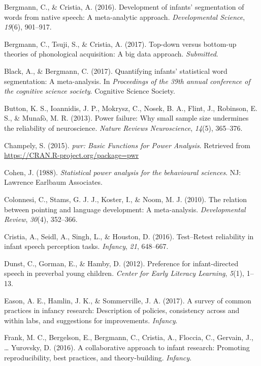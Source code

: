 \documentclass[english,floatsintext,man]{apa6}
\begin{document}
\hypertarget{ref-InWordDB}{}
Bergmann, C., \& Cristia, A. (2016). Development of infants'
segmentation of words from native speech: A meta-analytic approach.
\emph{Developmental Science}, \emph{19}(6), 901--917.

\hypertarget{ref-TopDownBottomUp}{}
Bergmann, C., Tsuji, S., \& Cristia, A. (2017). Top-down versus
bottom-up theories of phonological acquisition: A big data approach.
\emph{Submitted}.

\hypertarget{ref-InStatDB}{}
Black, A., \& Bergmann, C. (2017). Quantifying infants' statistical word
segmentation: A meta-analysis. In \emph{Proceedings of the 39th annual
conference of the cognitive science society}. Cognitive Science Society.

\hypertarget{ref-button2013power}{}
Button, K. S., Ioannidis, J. P., Mokrysz, C., Nosek, B. A., Flint, J.,
Robinson, E. S., \& Munafò, M. R. (2013). Power failure: Why small
sample size undermines the reliability of neuroscience. \emph{Nature
Reviews Neuroscience}, \emph{14}(5), 365--376.

\hypertarget{ref-pwr}{}
Champely, S. (2015). \emph{pwr: Basic Functions for Power Analysis}.
Retrieved from \url{https://CRAN.R-project.org/package=pwr}

\hypertarget{ref-cohen}{}
Cohen, J. (1988). \emph{Statistical power analysis for the behavioural
sciences}. NJ: Lawrence Earlbaum Associates.

\hypertarget{ref-PointingMA}{}
Colonnesi, C., Stams, G. J. J., Koster, I., \& Noom, M. J. (2010). The
relation between pointing and language development: A meta-analysis.
\emph{Developmental Review}, \emph{30}(4), 352--366.

\hypertarget{ref-TestRetest}{}
Cristia, A., Seidl, A., Singh, L., \& Houston, D. (2016). Test--Retest
reliability in infant speech perception tasks. \emph{Infancy},
\emph{21}, 648--667.

\hypertarget{ref-IDS_MA}{}
Dunst, C., Gorman, E., \& Hamby, D. (2012). Preference for
infant-directed speech in preverbal young children. \emph{Center for
Early Literacy Learning}, \emph{5}(1), 1--13.

\hypertarget{ref-eason2017survey}{}
Eason, A. E., Hamlin, J. K., \& Sommerville, J. A. (2017). A survey of
common practices in infancy research: Description of policies,
consistency across and within labs, and suggestions for improvements.
\emph{Infancy}.

\hypertarget{ref-Manybabies}{}
Frank, M. C., Bergelson, E., Bergmann, C., Cristia, A., Floccia, C.,
Gervain, J., \ldots{} Yurovsky, D. (2016). A collaborative approach to
infant research: Promoting reproducibility, best practices, and
theory-building. \emph{Infancy}.
\end{document}
